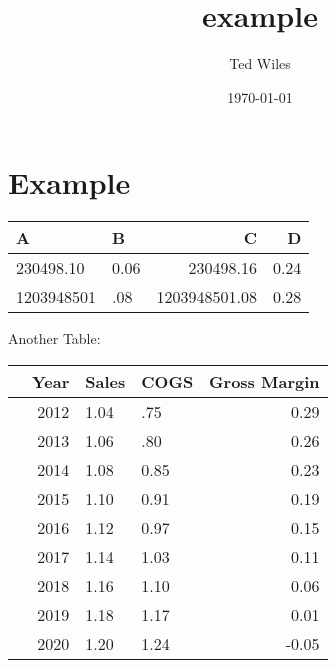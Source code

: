 \documentclass[11pt]{article}
\author{Ted Wiles}
\date{\today}
\title{example}
\begin{document}
\maketitle
\tableofcontents

\section{Example}
\label{sec-1}


\begin{tabular}{llrr}
A & B & C \footnotemark & D \footnotemark\\
\hline
230498.10 \footnotemark & 0.06 \footnotemark & 230498.16 & 0.24\\
1203948501 & .08 & 1203948501.08 & 0.28\\
\end{tabular}


Another Table:

\begin{tabular}{lrllr}
 & Year & Sales & COGS & Gross Margin \footnotemark\\
\hline
 & 2012 & 1.04 & .75 & 0.29\\
 & 2013 & 1.06 & .80 & 0.26\\
 & 2014 & 1.08 & 0.85 & 0.23\\
 & 2015 & 1.10 \footnotemark & 0.91 \footnotemark[6]{} & 0.19\\
 & 2016 & 1.12 \footnotemark[6]{} & 0.97 \footnotemark[6]{} & 0.15\\
 & 2017 & 1.14 \footnotemark[6]{} & 1.03 \footnotemark[6]{} & 0.11\\
 & 2018 & 1.16 \footnotemark[6]{} & 1.10 \footnotemark[6]{} & 0.06\\
 & 2019 & 1.18 \footnotemark[6]{} & 1.17 \footnotemark[6]{} & 0.01\\
 & 2020 & 1.20 \footnotemark[6]{} & 1.24 \footnotemark[6]{} & -0.05\\
\end{tabular}
\end{document}
